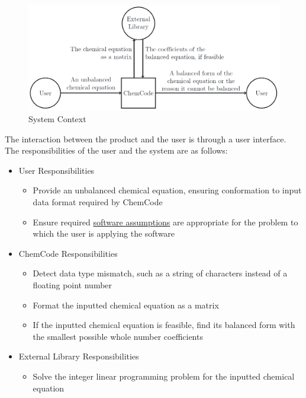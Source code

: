 \documentclass[12pt]{article}
\begin{document}
\begin{figure}
\begin{center}
\includegraphics[width=\textwidth]{../../../../datafiles/chemcode/sysCtxFig.png}
\caption{System Context}
\label{Figure:sysCtxFig}
\end{center}
\end{figure}
The interaction between the product and the user is through a user interface. The responsibilities of the user and the system are as follows:

\begin{itemize}
\item{User Responsibilities}
\begin{itemize}
\item{Provide an unbalanced chemical equation, ensuring conformation to input data format required by ChemCode}
\item{Ensure required \hyperref[Sec:Assumps]{software assumptions} are appropriate for the problem to which the user is applying the software}
\end{itemize}
\item{ChemCode Responsibilities}
\begin{itemize}
\item{Detect data type mismatch, such as a string of characters instead of a floating point number}
\item{Format the inputted chemical equation as a matrix}
\item{If the inputted chemical equation is feasible, find its balanced form with the smallest possible whole number coefficients}
\end{itemize}
\item{External Library Responsibilities}
\begin{itemize}
\item{Solve the integer linear programming problem for the inputted chemical equation}
\end{itemize}
\end{itemize}
\end{document}
